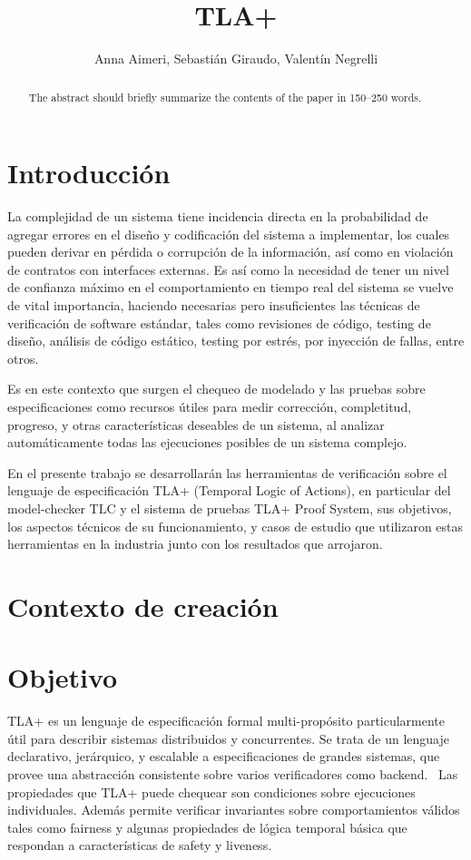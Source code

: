 \documentclass[runningheads]{llncs}
\begin{document}
\title{TLA+}
\author{Anna Aimeri, Sebastián Giraudo, Valentín Negrelli}
\maketitle              %
%
\begin{abstract}
The abstract should briefly summarize the contents of the paper in
150--250 words.
\end{abstract}

\section{Introducción}
La complejidad de un sistema tiene incidencia directa en la probabilidad de agregar errores en el diseño y codificación del sistema a implementar, los cuales pueden derivar en pérdida o corrupción de la información, así como en violación de contratos con interfaces externas. Es así como la necesidad de tener un nivel de confianza máximo en el comportamiento en tiempo real del sistema se vuelve de vital importancia, haciendo necesarias pero insuficientes las técnicas de verificación de software estándar, tales como revisiones de código, testing de diseño, análisis de código estático, testing por estrés, por inyección de fallas, entre otros. 

Es en este contexto que surgen el chequeo de modelado y las pruebas sobre especificaciones como recursos útiles para medir corrección, completitud, progreso, y otras características deseables de un sistema, al analizar automáticamente todas las ejecuciones posibles de un sistema complejo.

En el presente trabajo se desarrollarán las herramientas de verificación sobre el lenguaje de especificación TLA+ (Temporal Logic of Actions), en particular del model-checker TLC y el sistema de pruebas TLA+ Proof System, sus objetivos, los aspectos técnicos de su funcionamiento, y casos de estudio que utilizaron estas herramientas en la industria junto con los resultados que arrojaron.


\section{Contexto de creación}

\section{Objetivo}
TLA+ es un lenguaje de especificación formal multi-propósito particularmente útil para describir sistemas distribuidos y concurrentes. Se trata de un lenguaje declarativo, jerárquico, y escalable a especificaciones de grandes sistemas, que provee una abstracción consistente sobre varios verificadores como backend. 
Las propiedades que TLA+ puede chequear son condiciones sobre ejecuciones individuales. Además permite verificar invariantes sobre comportamientos válidos tales como fairness y algunas propiedades de lógica temporal básica que respondan a características de safety y liveness.
\end{document}
